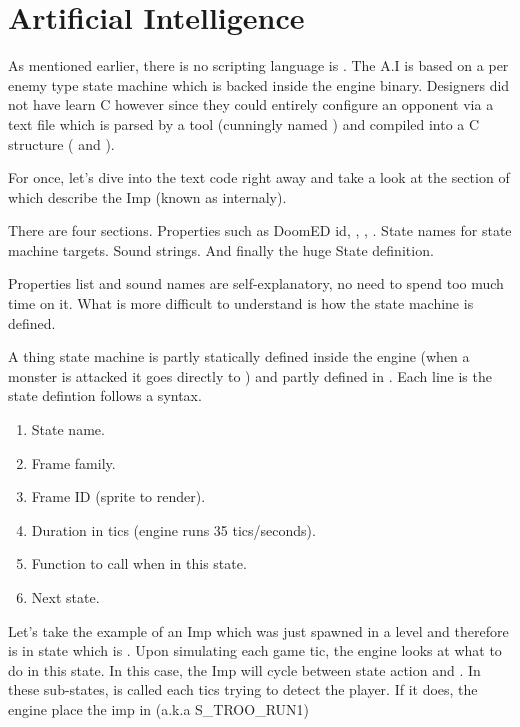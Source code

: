 \section{Artificial Intelligence}
As mentioned earlier, there is no scripting language is \doom. The A.I is based on a per enemy type state machine which is backed inside the engine binary. Designers did not have learn C however since they could entirely configure an opponent via a text file  which is parsed by a tool (cunningly named ) and compiled into a C structure ( and ).\\
\par
{}
\par
For once, let's dive into the text code right away and take a look at the section of   which describe the Imp (known as  internaly).\\
\par
{}


There are four sections. Properties such as DoomED id, , , . State names for state machine targets. Sound strings. And finally the huge State definition.






Properties list and sound names are self-explanatory, no need to spend too much time on it. What is more difficult to understand is how the state machine is defined.\\
\par
A thing state machine is partly statically defined inside the engine (when a monster is attacked it goes directly to ) and partly defined in . Each line is the state defintion follows a syntax.
\begin{enumerate}
\item State name.
\item Frame family.
\item Frame ID (sprite to render).
\item Duration in tics (engine runs 35 tics/seconds).
\item Function to call when in this state.
\item Next state.
\end{enumerate}
\par
Let's take the example of an Imp which was just spawned in a level and therefore is in state  which is . Upon simulating each game tic, the engine looks at what to do in this state. In this case, the Imp will cycle between state action  and . In these sub-states,  is called each tics trying to detect the player. If it does, the engine place the imp in  (a.k.a S\_TROO\_RUN1)\\
\par

